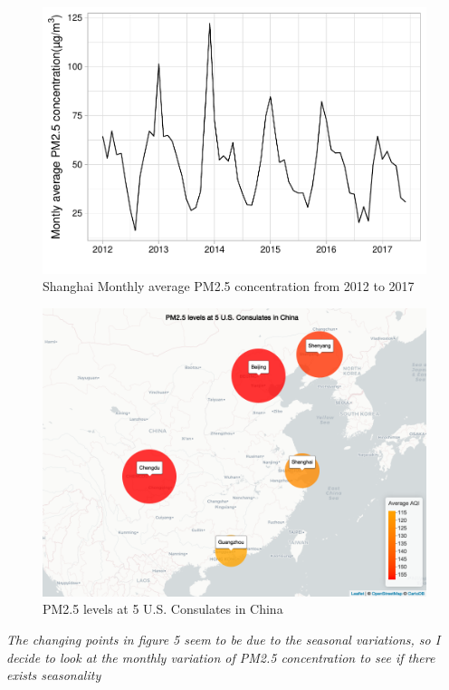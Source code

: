 \documentclass[12pt,]{article}
\begin{document}
\begin{figure}
\centering
\includegraphics{Project_Template_files/figure-latex/unnamed-chunk-4-1.pdf}
\caption{Shanghai Monthly average PM2.5 concentration from 2012 to 2017}
\end{figure}

\begin{figure}
\includegraphics[width=1\linewidth]{myMap} \caption{PM2.5 levels at 5 U.S. Consulates in China}\label{fig:PM2.5 levels at 5 U.S. Consulates in China}
\end{figure}

\emph{The changing points in figure 5 seem to be due to the seasonal
variations, so I decide to look at the monthly variation of PM2.5
concentration to see if there exists seasonality}
\end{document}
